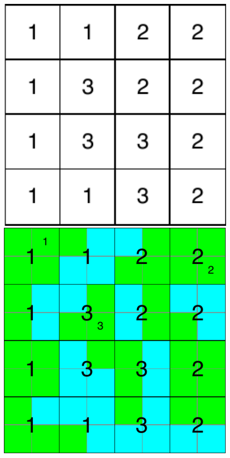 \begin{frame}
\begin{columns}
	\centering
	\begin{overprint}
		\centering\includegraphics[width=0.9\textwidth]{images/regiones.pdf}
		\onslide<4-|handout:0>\centering\includegraphics[width=0.9\textwidth]{images/celdas.pdf}
	\end{overprint}
\end{columns}
\end{frame}

